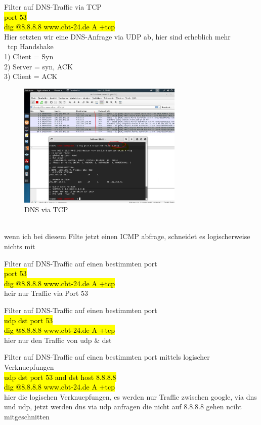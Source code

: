 \documentclass[]{article}
\begin{document}
\begin{description}
	\item Filter auf DNS-Traffic via TCP   \\ 
{\hl{port 53}} \\
{\hl{dig @8.8.8.8 www.cbt-24.de A +tcp}} \\ 
Hier setzten wir eine DNS-Anfrage via UDP ab, hier sind erheblich mehr \\\
tcp Handshake \\
1) Client = Syn\\
2) Server = syn, ACK\\
3) Client = ACK\\
\begin{figure}[htbp] 
	\centering
	\includegraphics[width=0.7\textwidth]{./imgs/Picture3-Dig-DNS-tcp.JPG}
	\caption{DNS via TCP}
	\label{fig:Bild3}
	
\end{figure}
\\ wenn ich bei diesem Filte jetzt einen ICMP abfrage, schneidet es logischerweise nichts mit

	\item Filter auf DNS-Traffic auf einen bestimmten port  \\ 
	{\hl{port 53}} \\
	{\hl{dig @8.8.8.8 www.cbt-24.de A +tcp}} \\ 
	heir nur Traffic via Port 53
	
	\item Filter auf DNS-Traffic auf einen bestimmten port  \\ 
	{\hl{udp dst port 53}} \\
	{\hl{dig @8.8.8.8 www.cbt-24.de A +tcp}} \\ 
	hier nur den Traffic von udp \& dst 
	
	\item Filter auf DNS-Traffic auf einen bestimmten port mittels logischer Verknuepfungen  \\ 
	{\sethlcolor{cyan}\hl{udp dst port 53 and dst host 8.8.8.8}} \\
	{\hl{dig @8.8.8.8 www.cbt-24.de A +tcp}} \\ 
	hier die logischen Verknuepfungen, es werden nur Traffic zwischen google, via dns und udp, jetzt werden dns via udp anfragen die nicht auf 8.8.8.8 gehen nciht mitgeschnitten
	

\end{description}
\end{document}
